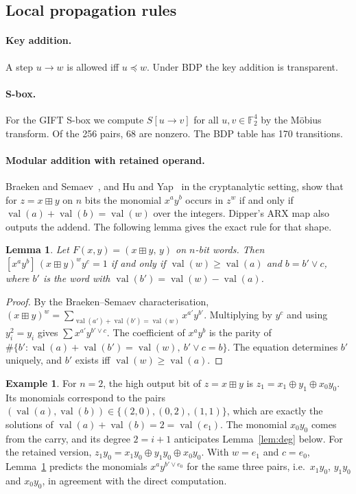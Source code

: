 \documentclass[11pt,a4paper]{article}
\newtheorem{lemma}{Lemma}
\theoremstyle{definition}
\newtheorem{example}{Example}
\theoremstyle{remark}
\newcommand{\add}{\boxplus}
\newcommand{\F}{\mathbb{F}_2}
\newcommand{\val}{\operatorname{val}}
\begin{document}
\subsection{Local propagation rules}

\paragraph{Key addition.} A step $u\to w$ is allowed iff $u\preceq w$. Under BDP the key addition is transparent.

\paragraph{S-box.} For the GIFT S-box we compute $S[u\to v]$ for all $u,v\in\F^4$ by the Möbius transform. Of the 256 pairs, 68 are nonzero. The BDP table has 170 transitions.

\paragraph{Modular addition with retained operand.} Braeken and Semaev~\cite{braeken2005}, and Hu and Yap~\cite{huyap2024} in the cryptanalytic setting, show that for $z=x\add y$ on $n$ bits the monomial $x^ay^b$ occurs in $z^w$ if and only if $\val(a)+\val(b)=\val(w)$ over the integers. Dipper's ARX map also outputs the addend. The following lemma gives the exact rule for that shape.

\begin{lemma}\label{lem:addret}
Let $F(x,y)=(x\add y,\,y)$ on $n$-bit words. Then $[x^a y^b]\,(x\add y)^w y^c = 1$ if and only if $\val(w)\ge\val(a)$ and $b = b'\vee c$, where $b'$ is the word with $\val(b')=\val(w)-\val(a)$.
\end{lemma}
\begin{proof}
By the Braeken--Semaev characterisation, $(x\add y)^w=\sum_{\val(a')+\val(b')=\val(w)}x^{a'}y^{b'}$. Multiplying by $y^c$ and using $y_i^2=y_i$ gives $\sum x^{a'}y^{b'\vee c}$. The coefficient of $x^ay^b$ is the parity of $\#\{b' : \val(a)+\val(b')=\val(w),\ b'\vee c=b\}$. The equation determines $b'$ uniquely, and $b'$ exists iff $\val(w)\ge\val(a)$.
\end{proof}


\begin{example}\label{ex:add}
For $n=2$, the high output bit of $z=x\add y$ is $z_1=x_1\oplus y_1\oplus x_0y_0$. Its monomials correspond to the pairs $(\val(a),\val(b))\in\{(2,0),(0,2),(1,1)\}$, which are exactly the solutions of $\val(a)+\val(b)=2=\val(e_1)$. The monomial $x_0y_0$ comes from the carry, and its degree $2=i+1$ anticipates Lemma~\ref{lem:deg} below. For the retained version, $z_1y_0=x_1y_0\oplus y_1y_0\oplus x_0y_0$. With $w=e_1$ and $c=e_0$, Lemma~\ref{lem:addret} predicts the monomials $x^ay^{b'\vee e_0}$ for the same three pairs, i.e.\ $x_1y_0$, $y_1y_0$ and $x_0y_0$, in agreement with the direct computation.
\end{example}
\end{document}
